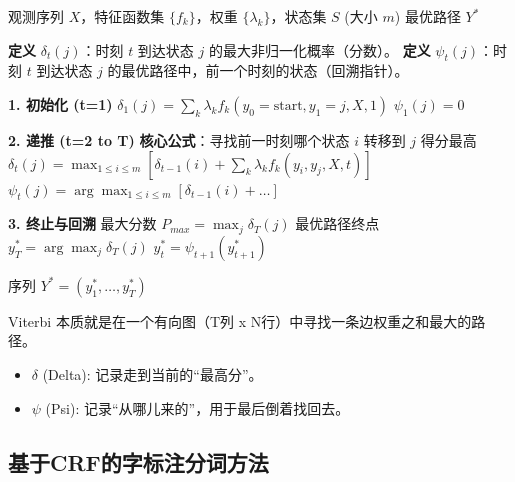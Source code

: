 \documentclass[a4paper, 11pt]{ctexart}
\begin{document}
\begin{algorithm}[H]
    \caption{Viterbi 算法 (CRF 解码)}
    \begin{algorithmic}[1]
        \Require 观测序列 $X$，特征函数集 $\{f_k\}$，权重 $\{\lambda_k\}$，状态集 $S$ (大小 $m$)
        \Ensure 最优路径 $Y^*$
        
        \State \textbf{定义} $\delta_t(j)$：时刻 $t$ 到达状态 $j$ 的最大非归一化概率（分数）。
        \State \textbf{定义} $\psi_t(j)$：时刻 $t$ 到达状态 $j$ 的最优路径中，前一个时刻的状态（回溯指针）。

        \State \textbf{1. 初始化 (t=1)}
            \State $\delta_1(j) = \sum_k \lambda_k f_k(y_0=\text{start}, y_1=j, X, 1)$
            \State $\psi_1(j) = 0$
        \EndFor

        \State \textbf{2. 递推 (t=2 to T)}
                \State \textbf{核心公式}：寻找前一时刻哪个状态 $i$ 转移到 $j$ 得分最高
                \State $\delta_t(j) = \max_{1 \le i \le m} \left[ \delta_{t-1}(i) + \sum_k \lambda_k f_k(y_{i}, y_{j}, X, t) \right]$
                \State $\psi_t(j) = \arg\max_{1 \le i \le m} \left[ \delta_{t-1}(i) + \dots \right]$
            \EndFor
        \EndFor

        \State \textbf{3. 终止与回溯}
        \State 最大分数 $P_{max} = \max_j \delta_T(j)$
        \State 最优路径终点 $y_T^* = \arg\max_j \delta_T(j)$
            \State $y_t^* = \psi_{t+1}(y_{t+1}^*)$
        \EndFor
        
        \State \Return 序列 $Y^* = (y_1^*, \dots, y_T^*)$
    \end{algorithmic}
\end{algorithm}

\begin{note}[Viterbi 总结]
Viterbi 本质就是在一个有向图（T列 x N行）中寻找一条边权重之和最大的路径。
\begin{itemize}
    \item $\delta$ (Delta): 记录走到当前的“最高分”。
    \item $\psi$ (Psi): 记录“从哪儿来的”，用于最后倒着找回去。
\end{itemize}
\end{note}


\subsection{基于CRF的字标注分词方法}
\end{document}
